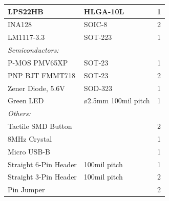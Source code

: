 \begin{center}
\begin{tabular}{|l|l|c|}
	\hline
	LPS22HB & HLGA-10L & 1 \\
	\hline
	INA128 & SOIC-8 & 2 \\
	\hline
	LM1117-3.3 & SOT-223 & 1 \\
	\hline
	\emph{Semiconductors:} & & \\
	\hline
	P-MOS PMV65XP & SOT-23 & 1 \\
	\hline
	PNP BJT FMMT718 & SOT-23 & 2 \\
	\hline
	Zener Diode, 5.6V & SOD-323 & 1 \\
	\hline
	Green LED & ø2.5mm 100mil pitch& 1 \\
	\hline
	\emph{Others:} & & \\
	\hline
	Tactile SMD Button & & 2 \\
	\hline
	8MHz Crystal & & 1 \\
	\hline
	Micro USB-B & & 1 \\
	\hline
	Straight 6-Pin Header & 100mil pitch & 1 \\
	\hline
	Straight 3-Pin Header & 100mil pitch & 2 \\
	\hline
	Pin Jumper & & 2 \\
	\hline
\end{tabular}
\end{center}

\clearpage
